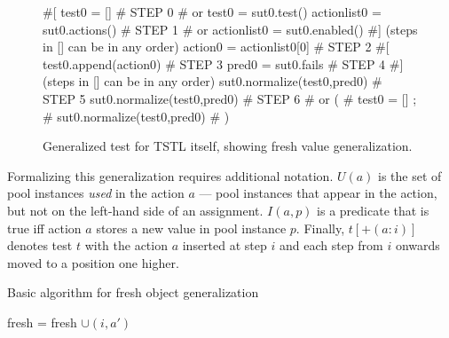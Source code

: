 \begin{figure}
{\scriptsize
\begin{code}
\textcolor{black!60}{\#[}
test0 = []                             \textcolor{black!60}{\# STEP 0}
\textcolor{black!60}{\#  or test0 = sut0.test() }
actionlist0 = sut0.actions()           \textcolor{black!60}{\# STEP 1}
\textcolor{black!60}{\#  or actionlist0 = sut0.enabled() }
\textcolor{black!60}{\#] (steps in [] can be in any order)}
action0 = actionlist0[0]               \textcolor{black!60}{\# STEP 2}
\textcolor{black!60}{\#[}
test0.append(action0)                  \textcolor{black!60}{\# STEP 3}
pred0 = sut0.fails                     \textcolor{black!60}{\# STEP 4}
\textcolor{black!60}{\#] (steps in [] can be in any order)}
sut0.normalize(test0,pred0)            \textcolor{black!60}{\# STEP 5}
sut0.normalize(test0,pred0)            \textcolor{black!60}{\# STEP 6}
\textcolor{black!60}{\#  or (}
\textcolor{black!60}{\#      test0 = []  ;}
\textcolor{black!60}{\#      sut0.normalize(test0,pred0) }
\textcolor{black!60}{\#     )}
\end{code}
}
\caption{Generalized test for TSTL itself, showing fresh value
  generalization.}
\label{fig:mislead}
\end{figure}

Formalizing this generalization requires additional notation.
$U(a)$ is the set of pool instances \emph{used} in the action $a$ ---
pool instances that appear
in the action, but not on the left-hand side of an assignment.
$I(a,p)$ is a predicate that is true iff action $a$ stores a new value
in pool instance $p$.  Finally, $t[+(a: i)]$ denotes test $t$ with the action
$a$ inserted at step $i$ and each step from $i$ onwards moved to a
position one higher.

\begin{algorithm}
\caption{Basic algorithm for fresh object generalization}
\label{freshalg}
{\scriptsize
\begin{algorithmic}[1]
\State fresh = fresh $\cup (i,a')$
\EndIf
\EndFor 
\EndFor
\EndFor
{}
\end{algorithmic}
}
\end{algorithm}


